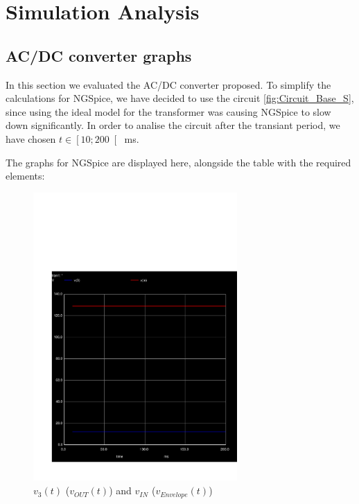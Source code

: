 \section{Simulation Analysis }
\label{sec:simulation}

\subsection{AC/DC converter graphs}

In this section we evaluated the AC/DC converter proposed. To simplify the calculations for NGSpice, we have decided to use the circuit \ref{fig:Circuit_Base_S}, since using the ideal model for the transformer was causing NGSpice to slow down significantly.
In order to analise the circuit after the transiant period, we have chosen $t \in \left[ 10 ; 200 \right[ $ ms.

The graphs for NGSpice are displayed here, alongside the table with the required elements:

\begin{figure}[h] \centering
\vspace{-3cm}
\includegraphics[height=11cm]{../sim/trans4.pdf}
\caption{$v_3(t)$ ($v_{OUT}(t)$) and $v_{IN}$ ($v_{Envelope}(t)$)}
\label{fig:SIM_FULL_RES}
\end{figure}

